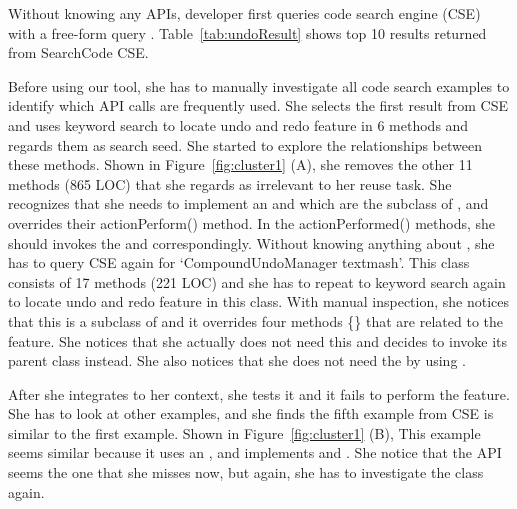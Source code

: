    
 Without knowing any APIs, developer  first queries code search engine (CSE) with a free-form query . %
Table~\ref{tab:undoResult} shows top 10 results returned from SearchCode CSE. %

Before using our tool, she has to manually investigate all code search examples to identify which API calls are frequently used. She selects the first result from CSE and uses keyword search to locate undo and redo feature in 6 methods and regards them as search seed. She started to explore the relationships between these methods.  Shown in Figure~\ref{fig:cluster1} (A), she removes  the other  11 methods (865 LOC) that she regards as irrelevant to her reuse task. She recognizes that she needs to implement an  and  which are the subclass of , and overrides their actionPerform() method. In the actionPerformed() methods, she should invokes the  and   correspondingly. Without knowing anything about , she has to query CSE again for `CompoundUndoManager textmash'. This class consists of 17 methods (221 LOC) and she has to repeat to keyword search again to locate undo and redo feature in this class. With manual inspection, she notices that this  is a subclass of  and it overrides four methods \{\} that are related to the feature. She notices that she actually does not need this  and decides to invoke its parent class   instead. She also notices that she does not need the  by using . 

After she integrates  to her context, she tests it and it fails to perform the feature. She has to look at other examples, and she finds the fifth example from CSE is similar to the first example.  Shown in Figure~\ref{fig:cluster1} (B), This example seems similar because it uses an , and implements  and . She notice that  the API  seems the one that she misses now, but again, she has to investigate the class    again. 

